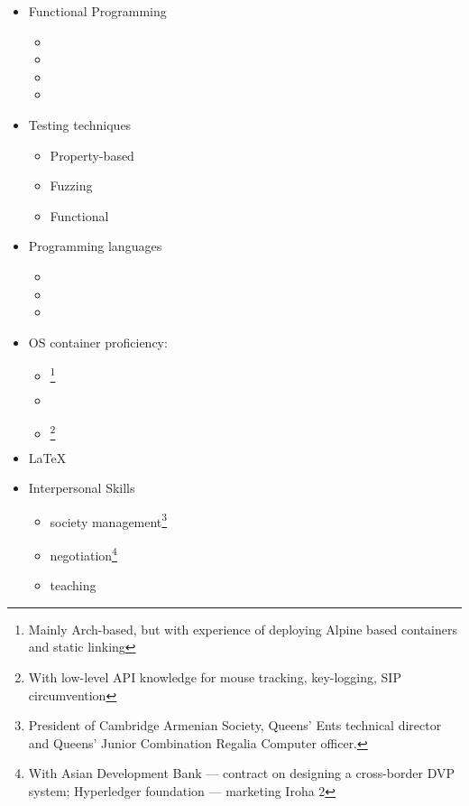 \documentclass{CurriculumVitae}[10pt, draft, condensed]
\begin{document}
\begin{multicols}{4}
\begin{itemize}[topsep=0pt]
\begin{itemize}[topsep=0pt, partopsep=0pt]
    \item {}
    \item {}
    \end{itemize}
  \item {\footnotesize Functional Programming}
    \begin{itemize}[topsep=0pt, partopsep=0pt]
      \setlength{\itemsep}{-0.3em}
    \item {}
    \item {}
    \item {}
    \item {}
    \end{itemize}
  \item {\footnotesize Testing techniques}
    \begin{itemize}[topsep=0pt, partopsep=0pt]
      \setlength{\itemsep}{-0.3em}
    \item {\footnotesize Property-based}
    \item {\footnotesize Fuzzing}
    \item {\footnotesize Functional}
    \end{itemize}
  \item {\footnotesize Programming languages}
    \begin{itemize}[topsep=0pt, partopsep=0pt]
      \setlength{\itemsep}{-0.3em}
    \item {}
    \item {}
    \item {}
    \end{itemize}
  \item {\footnotesize OS container proficiency:}
    \begin{itemize}[topsep=0pt, partopsep=0pt]
      \setlength{\itemsep}{-0.3em}
    \item {}\footnote{Mainly Arch-based, but with experience
        of deploying Alpine based containers and static linking}
    \item {}
    \item {}\footnote{With low-level API knowledge for
        mouse tracking, key-logging, SIP circumvention}
    \end{itemize}
  \item {\footnotesize \LaTeX{}}
  \item {\footnotesize Interpersonal Skills}
    \begin{itemize}[topsep=0pt, partopsep=0pt]
      \setlength{\itemsep}{-0.3em}
    \item society management\footnote{President of Cambridge Armenian
        Society, Queens' Ents technical director and Queens' Junior
        Combination Regalia Computer officer. }
    \item negotiation\footnote{With Asian Development Bank ---
        contract on designing a cross-border DVP system; Hyperledger
        foundation ---  marketing Iroha 2}
    \item teaching
    \end{itemize}
  \end{itemize}


\end{multicols}
\end{document}
